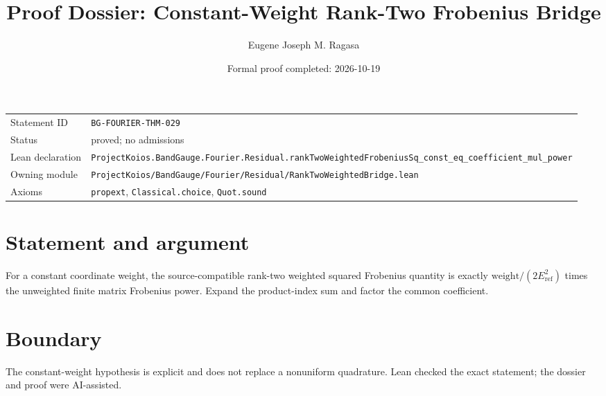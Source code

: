 \documentclass[11pt]{article}
\title{Proof Dossier: Constant-Weight Rank-Two Frobenius Bridge}
\author{Eugene Joseph M. Ragasa}
\date{Formal proof completed: 2026-10-19}
\begin{document}
\maketitle
\noindent\begin{tabularx}{\textwidth}{@{}lX@{}}\toprule
Statement ID & \texttt{BG-FOURIER-THM-029} \\
Status & proved; no admissions \\
Lean declaration & \texttt{ProjectKoios.BandGauge.Fourier.Residual.}\newline\texttt{rankTwoWeightedFrobeniusSq\_const\_eq\_coefficient\_mul\_power} \\
Owning module & \texttt{ProjectKoios/BandGauge/Fourier/Residual/RankTwoWeightedBridge.lean} \\
Axioms & \texttt{propext}, \texttt{Classical.choice}, \texttt{Quot.sound} \\
\bottomrule\end{tabularx}
\section{Statement and argument}
For a constant coordinate weight, the source-compatible rank-two weighted squared Frobenius quantity is exactly $\mathrm{weight}/(2E_{\mathrm{ref}}^2)$ times the unweighted finite matrix Frobenius power. Expand the product-index sum and factor the common coefficient.
\section{Boundary}
The constant-weight hypothesis is explicit and does not replace a nonuniform quadrature. Lean checked the exact statement; the dossier and proof were AI-assisted.
\end{document}
